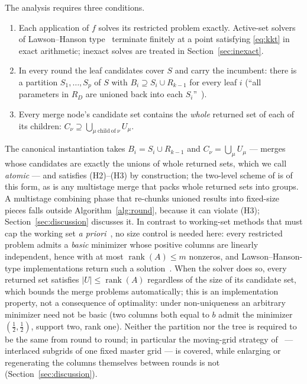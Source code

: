 \documentclass[pdflatex,sn-mathphys-num]{sn-jnl}
\theoremstyle{thmstyleone}
\theoremstyle{thmstyletwo}
\begin{document}
\FloatBarrier
{}
The analysis requires three conditions.
\begin{enumerate}
\item[(H1)] Each application of $f$ solves its restricted problem
exactly. Active-set solvers of Lawson--Hanson
type~\cite{lawson1974,bro1997} terminate finitely at a point satisfying
\eqref{eq:kkt} in exact arithmetic; inexact solves are treated in
Section~\ref{sec:inexact}.
\item[(H2)] In every round the leaf candidates cover $S$ and carry the
incumbent: there is a partition $S_1,\dots,S_p$ of $S$ with
$B_i\supseteq S_i\cup R_{k-1}$ for every leaf $i$ (``all parameters in
$R_D$ are unioned back into each $S_i$''~\cite{brookes2006}).
\item[(H3)] Every merge node's candidate set contains the \emph{whole}
returned set of each of its children:
$C_\nu\supseteq\bigcup_{\mu\ \mathrm{child\ of}\ \nu}U_\mu$.
\end{enumerate}
The canonical instantiation takes $B_i=S_i\cup R_{k-1}$ and
$C_\nu=\bigcup_\mu U_\mu$ --- merges whose candidates are exactly the
unions of whole returned sets, which we call \emph{atomic} --- and
satisfies (H2)--(H3) by construction; the two-level scheme of
\cite[Text~1]{brookes2006} is of this form, as is any multistage merge
that packs whole returned sets into groups. A multistage combining
phase that re-chunks unioned results into fixed-size pieces falls
outside Algorithm~\ref{alg:round}, because it can violate (H3);
Section~\ref{sec:discussion} discusses it. In contrast to
working-set methods that must cap the working set
\emph{a priori}~\cite{osuna1997}, no size control is needed here:
every restricted problem admits a \emph{basic} minimizer whose positive
columns are linearly independent, hence with at most
$\operatorname{rank}(A)\le m$ nonzeros, and Lawson--Hanson-type
implementations return such a solution~\cite{lawson1974}. When the
solver does so, every returned set satisfies
$|U|\le\operatorname{rank}(A)$ regardless of the size of its candidate
set, which bounds the merge problems automatically; this is an
implementation property, not a consequence of optimality: under
non-uniqueness an arbitrary minimizer need not be basic (two columns
both equal to $b$ admit the minimizer $(\tfrac12,\tfrac12)$, support
two, rank one). Neither the partition nor the tree is
required to be the same from round to round; in particular the
moving-grid strategy of~\cite{brookes2006} --- interlaced subgrids of
one fixed master grid --- is covered, while enlarging or regenerating
the columns themselves between rounds is not
(Section~\ref{sec:discussion}).
\end{document}

